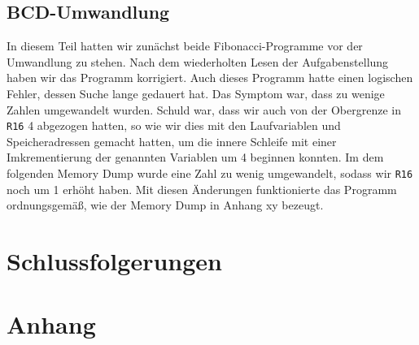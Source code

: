 \documentclass[12pt,a4paper]{scrartcl}
\begin{document}
\subsection*{BCD-Umwandlung}
In diesem Teil hatten wir zun\"achst beide Fibonacci-Programme vor der Umwandlung zu stehen.
Nach dem wiederholten Lesen der Aufgabenstellung haben wir das Programm korrigiert.
Auch dieses Programm hatte einen logischen Fehler, dessen Suche lange gedauert hat.
Das Symptom war, dass zu wenige Zahlen umgewandelt wurden.
Schuld war, dass wir auch von der Obergrenze in \texttt{R16} 4 abgezogen hatten, so wie wir dies mit den Laufvariablen und Speicheradressen gemacht hatten, um die innere Schleife mit einer Imkrementierung der genannten Variablen um 4 beginnen konnten.
Im dem folgenden Memory Dump wurde eine Zahl zu wenig umgewandelt, sodass wir \texttt{R16} noch um 1 erh\"oht haben.
Mit diesen \"Anderungen funktionierte das Programm ordnungsgem\"a\ss{}, wie der Memory Dump in Anhang xy bezeugt.

\section{Schlussfolgerungen}


\section{Anhang}
\clearpage
\clearpage
\clearpage
\clearpage
\end{document}
